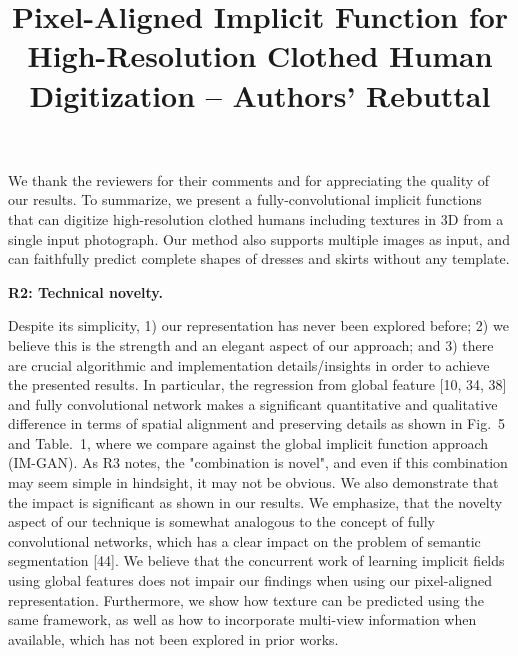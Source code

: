 \documentclass[10pt,twocolumn, letterpaper]{article}
\begin{document}
\setlength{\parindent}{0cm}



\title{\large{Pixel-Aligned Implicit Function for\\ High-Resolution Clothed Human Digitization -- Authors' Rebuttal}}
\maketitle


\newcommand{\QandA}[2] {

\textit{Q:~#1}

{\textit{A:}~#2}

}



\newcommand{\cShun}[1]{{\color{green}{#1}}}
\newcommand{\cRyo}[1]{{\color{blue}{#1}}}
\newcommand\todo[1]{\textcolor{red}{#1}}

We thank the reviewers for their comments and for appreciating the quality of our results. To summarize, we present a fully-convolutional implicit functions that can digitize high-resolution clothed humans including textures in 3D from a single input photograph. Our method also supports multiple images as input, and can faithfully predict complete shapes of dresses and skirts without any template.






\noindent\textbf{R2: Technical novelty.}

Despite its simplicity, 1) our representation has never been explored before; 2) we believe this is the strength and an elegant aspect of our approach; and 3) there are crucial algorithmic and implementation details/insights in order to achieve the presented results.
In particular, the regression from global feature [10, 34, 38] and fully convolutional network makes a significant quantitative and qualitative difference in terms of spatial alignment and preserving details as shown in Fig.~5 and Table.~1, where we compare against the global implicit function approach (IM-GAN). As R3 notes, the "combination is novel", and even if this combination may seem simple in hindsight, it may not be obvious. We also demonstrate that the impact is significant as shown in our results. We emphasize, that the novelty aspect of our technique is somewhat analogous to the concept of fully convolutional networks, which has a clear impact on the problem of semantic segmentation [44].
We believe that the concurrent work of learning implicit fields using global features does not impair our findings when using our pixel-aligned representation. Furthermore, we show how texture can be predicted using the same framework, as well as how to incorporate multi-view information when available, which has not been explored in prior works.
\end{document}
